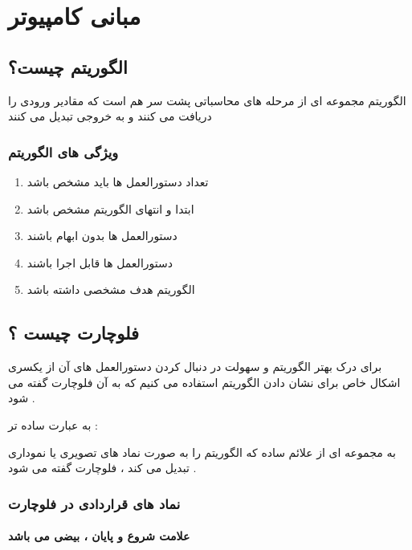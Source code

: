 \documentclass[12pt]{book}
\begin{document}
\tableofcontents

\newpage

\chapter{مبانی کامپیوتر}

\section{الگوریتم چیست؟}

الگوریتم مجموعه ای از مرحله های محاسباتی پشت سر هم است که مقادیر ورودی را دریافت می کنند و به خروجی تبدیل می کنند

\subsection{ویژگی های الگوریتم}

\begin{enumerate}
	\item تعداد دستورالعمل ها باید مشخص باشد
	\item ابتدا و انتهای الگوریتم مشخص باشد
	\item دستورالعمل ها بدون ابهام باشند
	\item دستورالعمل ها قابل اجرا باشند
	\item الگوریتم هدف مشخصی داشته باشد
\end{enumerate}

\section{فلوچارت چیست ؟}

برای درک بهتر الگوریتم و سهولت در دنبال کردن دستورالعمل های آن از یکسری اشکال خاص برای نشان دادن الگوریتم استفاده می کنیم که به آن فلوچارت گفته می شود .

به عبارت ساده تر :

به مجموعه ای از علائم ساده که الگوریتم را به صورت نماد های تصویری یا نموداری تبدیل می کند ، فلوچارت گفته می شود .

\subsection{نماد های قراردادی در فلوچارت}

\subsubsection{ علامت شروع و پایان ، بیضی می باشد}
\end{document}
